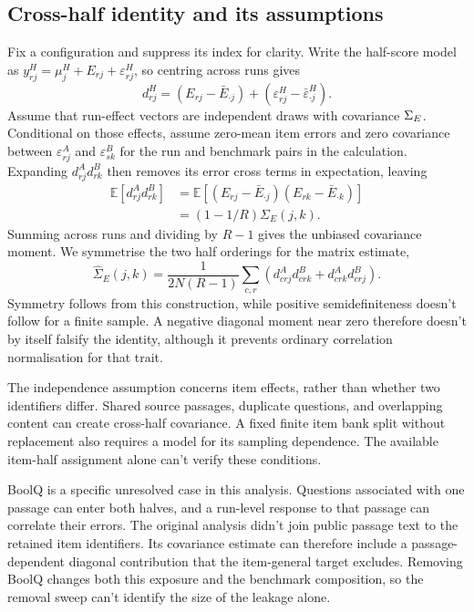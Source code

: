 \subsection{Cross-half identity and its assumptions}
Fix a configuration and suppress its index for clarity. Write the half-score model as $y^H_{rj}=\mu^H_j+E_{rj}+\varepsilon^H_{rj}$, so centring across runs gives
\begin{equation}
d^H_{rj}=(E_{rj}-\bar E_{\cdot j})+(\varepsilon^H_{rj}-\bar\varepsilon^H_{\cdot j}).
\end{equation}
Assume that run-effect vectors are independent draws with covariance $\Sigma_E$. Conditional on those effects, assume zero-mean item errors and zero covariance between $\varepsilon^A_{rj}$ and $\varepsilon^B_{sk}$ for the run and benchmark pairs in the calculation. Expanding $d^A_{rj}d^B_{rk}$ then removes its error cross terms in expectation, leaving
\begin{align}
\mathbb E[d^A_{rj}d^B_{rk}]
&=\mathbb E[(E_{rj}-\bar E_{\cdot j})(E_{rk}-\bar E_{\cdot k})]\\
&=(1-1/R)\Sigma_E(j,k).
\end{align}
Summing across runs and dividing by $R-1$ gives the unbiased covariance moment. We symmetrise the two half orderings for the matrix estimate,
\begin{equation}
\widehat\Sigma_E(j,k)=\frac{1}{2N(R-1)}\sum_{c,r}
\left(d^A_{crj}d^B_{crk}+d^A_{crk}d^B_{crj}\right).
\end{equation}
Symmetry follows from this construction, while positive semidefiniteness doesn't follow for a finite sample. A negative diagonal moment near zero therefore doesn't by itself falsify the identity, although it prevents ordinary correlation normalisation for that trait.

The independence assumption concerns item effects, rather than whether two identifiers differ. Shared source passages, duplicate questions, and overlapping content can create cross-half covariance. A fixed finite item bank split without replacement also requires a model for its sampling dependence. The available item-half assignment alone can't verify these conditions.

BoolQ is a specific unresolved case in this analysis. Questions associated with one passage can enter both halves, and a run-level response to that passage can correlate their errors. The original analysis didn't join public passage text to the retained item identifiers. Its covariance estimate can therefore include a passage-dependent diagonal contribution that the item-general target excludes. Removing BoolQ changes both this exposure and the benchmark composition, so the removal sweep can't identify the size of the leakage alone.

